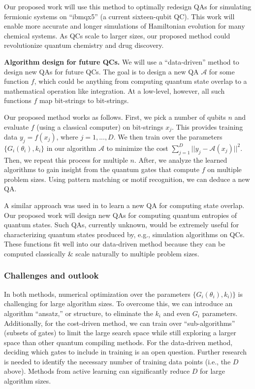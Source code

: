 \documentclass[10pt]{article}
\begin{document}
Our proposed work will use this method to optimally redesign QAs for simulating fermionic systems on ``ibmqx5'' (a current sixteen-qubit QC). This work will enable more accurate and longer simulations of Hamiltonian evolution for many chemical systems. As QCs scale to larger sizes, our proposed method could revolutionize quantum chemistry and drug discovery.

\textbf{Algorithm design for future QCs.} We will use a ``data-driven'' method to design new QAs for future QCs. The goal is to design a new QA $\mathcal{A}$ for some function $f$, which could be anything from computing quantum state overlap to a mathematical operation like integration. At a low-level, however, all such functions $f$ map bit-strings to bit-strings. %

Our proposed method works as follows. First, we pick a number of qubits $n$ and evaluate $f$ (using a classical computer) on bit-strings $x_j$. This provides training data $y_j = f(x_j)$, where $j = 1, ..., D$. We then train over the parameters $\{G_i(\theta_i), k_i\}$ in our algorithm $\mathcal{A}$ to minimize the cost $\sum_{j = 1}^{D} ||y_j - \mathcal{A}(x_j)||^2$. Then, we repeat this process for multiple $n$. After, we analyze the learned algorithms to gain insight from the quantum gates that compute $f$ on multiple problem sizes. Using pattern matching or motif recognition, we can deduce a new QA.

A similar approach was used in \cite{Cincio2018} to learn a new QA for computing state overlap. Our proposed work will design new QAs for computing quantum entropies of quantum states. Such QAs, currently unknown, would be extremely useful for characterizing quantum states produced by, e.g., simulation algorithms on QCs. These functions fit well into our data-driven method because they can be computed classically \& scale naturally to multiple problem sizes. %

\subsubsection{Challenges and outlook} 
In both methods, numerical optimization over the parameters $\{G_i(\theta_i), k_i)\}$ is challenging for large algorithm sizes. To overcome this, we can introduce an algorithm ``ansatz,'' or structure, to eliminate the $k_i$ and even $G_i$ parameters. Additionally, for the cost-driven method, we can train over ``sub-algorithms'' (subsets of gates) to limit the large search space while still exploring a larger space than other quantum compiling methods. %
For the data-driven method, deciding which gates to include in training is an open question. Further research is needed to identify the necessary number of training data points (i.e., the $D$ above). Methods from active learning can significantly reduce $D$ for large algorithm sizes.
\end{document}
